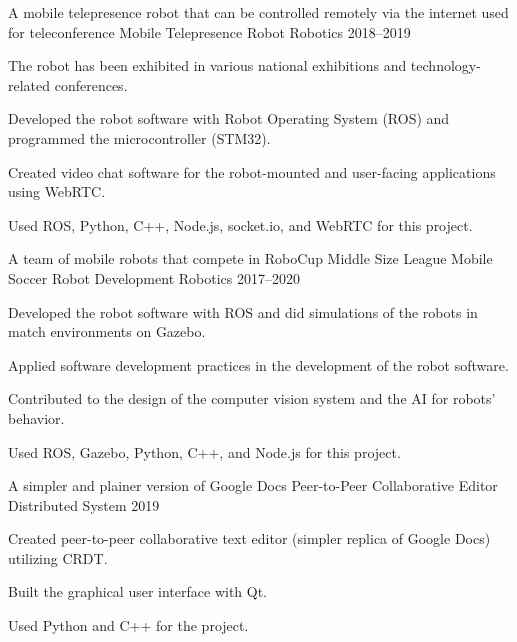 

\begin{cventries}
	\cventry
	{A mobile telepresence robot that can be controlled remotely via the internet used for teleconference} %
	{Mobile Telepresence Robot} %
	{Robotics} %
	{2018--2019} %
	{
		\begin{cvitems} %
			\item {The robot has been exhibited in various national exhibitions and technology-related conferences.}
			\item {Developed the robot software with Robot Operating System (ROS) and programmed the microcontroller (STM32).}
			\item {Created video chat software for the robot-mounted and user-facing applications using WebRTC.}
			\item {Used ROS, Python, C++, Node.js, socket.io, and WebRTC for this project.}
		\end{cvitems}
	}
    
    \cventry
    {A team of mobile robots that compete in RoboCup Middle Size League} %
    {Mobile Soccer Robot Development} %
    {Robotics} %
    {2017--2020} %
    {
    	\begin{cvitems} %
    		\item {Developed the robot software with ROS and did simulations of the robots in match environments on Gazebo.}
    		\item {Applied software development practices in the development of the robot software.}
    		\item {Contributed to the design of the computer vision system and the AI for robots' behavior.}
    		\item {Used ROS, Gazebo, Python, C++, and Node.js for this project.}
    	\end{cvitems}
    }
    
    \cventry
    {A simpler and plainer version of Google Docs} %
    {Peer-to-Peer Collaborative Editor} %
    {Distributed System} %
    {2019} %
    {
    	\begin{cvitems} %
    		\item {Created peer-to-peer collaborative text editor (simpler replica of Google Docs) utilizing CRDT.}
    		\item {Built the graphical user interface with Qt.}
    		\item {Used Python and C++ for the project.}
    	\end{cvitems}
    }
    

\end{cventries}
